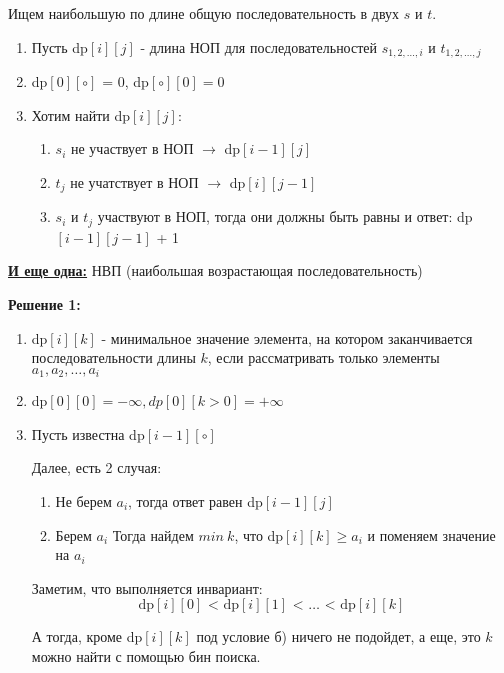 Ищем наибольшую по длине общую последовательность в двух $s$ и $t$. 

\begin{enumerate}
    \item Пусть dp$\left[i\right] \left[j\right]$ - длина НОП для последовательностей $s_{1, 2, \dots, i}$ и $t_{1, 2, \dots, j}$

    \item dp$\left[0\right] \left[\circ\right]$ = 0, dp$\left[\circ\right] \left[0\right] = 0$
    \item Хотим найти dp$\left[i\right] \left[j\right]$:
    \begin{enumerate}
        \item $s_i$ не участвует в НОП $\to$ dp$\left[i-1\right] \left[j\right]$
        \item $t_j$ не учатствует в НОП $\to$ dp$\left[i\right] \left[j-1\right]$
        \item $s_i$ и $t_j$ участвуют в НОП, тогда они должны быть равны и ответ: dp$\left[i-1\right] \left[j-1\right]$ + 1
    \end{enumerate}
\end{enumerate}

\underline{\textbf{И еще одна:}} НВП (наибольшая возрастающая последовательность)

\textbf{Решение 1:}

\begin{enumerate}
    \item dp$\left[i\right] \left[k\right]$ - минимальное значение элемента, на котором заканчивается последовательности длины $k$, если рассматривать только элементы $a_1, a_2, \dots, a_i$
    \item dp$\left[0\right] \left[0\right] = -\infty, dp[0][k > 0] = +\infty$
    \item Пусть известна dp$\left[i - 1\right] \left[\circ\right]$

    Далее, есть 2 случая:
    \begin{enumerate}
        \item Не берем $a_i$, тогда ответ равен dp$\left[i - 1\right] \left[j\right]$
        \item Берем $a_i$
        Тогда найдем $min\ k$, что dp$\left[i\right] \left[k\right] \ge a_i$ и поменяем значение на $a_i$
    \end{enumerate}
    Заметим, что выполняется инвариант: $$\text{dp$\left[i\right] \left[0\right]$ < dp$\left[i\right] \left[1\right]$ < $\dots$ < dp$\left[i\right] \left[k\right]$}$$

А тогда, кроме dp$\left[i\right] \left[k\right]$ под условие б) ничего не подойдет, а еще, это $k$ можно найти с помощью бин поиска. 
\end{enumerate}

